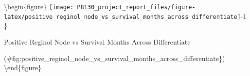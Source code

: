 \documentclass[
]{article}
\begin{document}
\textbackslash begin\{figure\}
\texttt{[image: P8130\_project\_report\_files/figure-latex/positive\_reginol\_node\_vs\_survival\_months\_across\_differentiate]}-1\}

\caption{Positive Reginol Node vs Survival Months Across Differentiate}

(\#fig:positive\_reginol\_node\_vs\_survival\_months\_across\_differentiate\})
\textbackslash end\{figure\}
\end{document}
